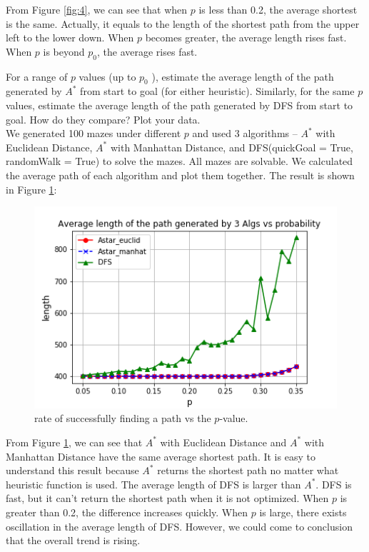 \documentclass[letter]{article}
\begin{document}
\begin{questions}
	From Figure \ref{fig:4}, we can see that when $ p $ is less than 0.2, the average shortest is the same. Actually, it equals to the length of the shortest path from the upper left to the lower down. When $ p $ becomes greater, the average length rises fast. When $ p $ is beyond $ p_0 $, the average rises fast. \\
	
	\item {For a range of $ p $ values (up to $ p_0 $ ), estimate the average length of the path generated by $ A^* $ from start to goal (for either heuristic). Similarly, for the same $ p $ values, estimate the average length of the path generated by DFS from start to goal. How do they compare? Plot your data.} \\
	
	We generated 100 mazes under different $ p $ and used 3 algorithms -- $ A^* $ with Euclidean Distance, $ A^* $ with Manhattan Distance, and DFS(quickGoal = True, randomWalk = True) to solve the mazes. All mazes are solvable. We calculated the average path of each algorithm and plot them together. The result is shown in Figure \ref{fig:5}: \\
	
	\begin{figure}
		\centering
		\includegraphics[width=\textwidth]{../pics/question5.png}
		\caption{\label{fig:5}rate of successfully finding a path vs the $ p $-value.}
	\end{figure}
	
	From Figure \ref{fig:5}, we can see that $ A^* $ with Euclidean Distance and $ A^* $ with Manhattan Distance have the same average shortest path. It is easy to understand this result because $ A^* $ returns the shortest path no matter what heuristic function is used. The average length of DFS is larger than $ A^* $. DFS is fast, but it can’t return the shortest path when it is not optimized. When $ p $ is greater than 0.2, the difference increases quickly. When $ p $ is large, there exists oscillation in the average length of DFS. However, we could come to conclusion that the overall trend is rising. \\
	

\end{questions}
\end{document}
